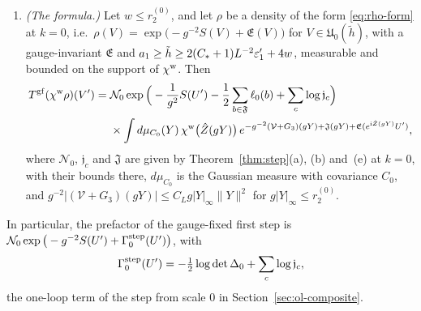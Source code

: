\begin{lemma}
\begin{enumerate}[label=(\alph*)]
\item \emph{(The formula.)} Let $w\le r^{(0)}_2$, and let $\rho$ be a density of the form \eqref{eq:rho-form} at $k=0$, i.e.\ $\rho(V)=\exp\big(-g^{-2}S(V)+\mathfrak E(V)\big)$ for $V\in\mathfrak U_0(\tilde h)$, with a gauge-invariant $\mathfrak E$ and $a_1\ge\tilde h\ge2(C_*+1)L^{-2}\varepsilon'_1+4w$, measurable and bounded on the support of $\chi^{\rm w}$. Then
\[
\begin{aligned}
T^{\rm gf}(\chi^{\rm w}\rho)(V')={}&\mathcal N_0\exp\Big(-\frac1{g^2}S(U')-\frac12\sum_{b\in\mathfrak F}\ell_0(b)+\sum_c\log\mathfrak j_c\Big)\\
&\times\int d\mu_{C_0}(Y)\,\chi^{\rm w}\big(\hat Z(gY)\big)\,e^{-g^{-2}(\mathcal V+G_3)(gY)+\mathfrak J(gY)+\mathfrak E(e^{\mathrm i\hat Z(gY)}U')},
\end{aligned}
\]
where $\mathcal N_0$, $\mathfrak j_c$ and $\mathfrak J$ are given by Theorem~\ref{thm:step}(a), (b) and~(e) at $k=0$, with their bounds there, $d\mu_{C_0}$ is the Gaussian measure with covariance $C_0$, and $g^{-2}|(\mathcal V+G_3)(gY)|\le C_Lg|Y|_\infty\|Y\|^2$ for $g|Y|_\infty\le r^{(0)}_2$.
\end{enumerate}
In particular, the prefactor of the gauge-fixed first step is $\mathcal N_0\exp\big(-g^{-2}S(U')+\Gamma^{\rm step}_0(U')\big)$, with
\[
\Gamma^{\rm step}_0(U')=-\tfrac12\log\det\Delta_0+\sum_c\log\mathfrak j_c ,
\]
the one-loop term of the step from scale $0$ in Section~\ref{sec:ol-composite}.
\end{lemma}

